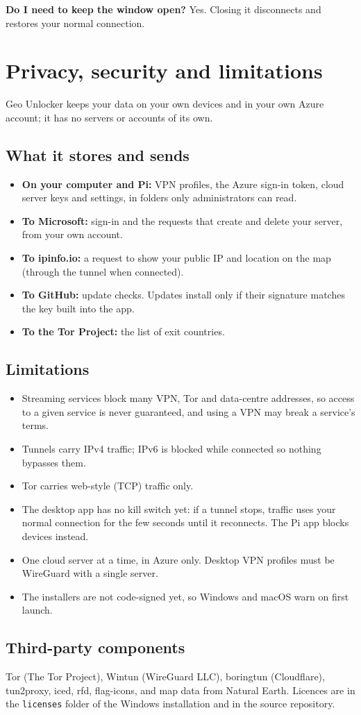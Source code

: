 \documentclass[11pt,a4paper]{article}
\newcommand{\file}[1]{\texttt{#1}}          %
\begin{document}
\textbf{Do I need to keep the window open?} Yes. Closing it disconnects and restores your normal connection.

\section{Privacy, security and limitations}

Geo Unlocker keeps your data on your own devices and in your own Azure account; it has no servers or accounts of its own.

\subsection{What it stores and sends}

\begin{itemize}
  \item \textbf{On your computer and Pi:} VPN profiles, the Azure sign-in token, cloud server keys and settings, in folders only administrators can read.
  \item \textbf{To Microsoft:} sign-in and the requests that create and delete your server, from your own account.
  \item \textbf{To ipinfo.io:} a request to show your public IP and location on the map (through the tunnel when connected).
  \item \textbf{To GitHub:} update checks. Updates install only if their signature matches the key built into the app.
  \item \textbf{To the Tor Project:} the list of exit countries.
\end{itemize}

\subsection{Limitations}

\begin{itemize}
  \item Streaming services block many VPN, Tor and data-centre addresses, so access to a given service is never guaranteed, and using a VPN may break a service's terms.
  \item Tunnels carry IPv4 traffic; IPv6 is blocked while connected so nothing bypasses them.
  \item Tor carries web-style (TCP) traffic only.
  \item The desktop app has no kill switch yet: if a tunnel stops, traffic uses your normal connection for the few seconds until it reconnects. The Pi app blocks devices instead.
  \item One cloud server at a time, in Azure only. Desktop VPN profiles must be WireGuard with a single server.
  \item The installers are not code-signed yet, so Windows and macOS warn on first launch.
\end{itemize}

\subsection{Third-party components}

Tor (The Tor Project), Wintun (WireGuard LLC), boringtun (Cloudflare), tun2proxy, iced, rfd, flag-icons, and map data from Natural Earth. Licences are in the \file{licenses} folder of the Windows installation and in the source repository.
\end{document}
